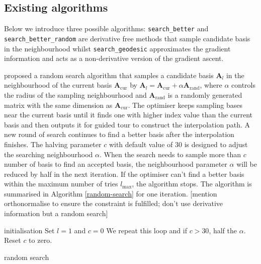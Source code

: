 \documentclass[12pt]{article}
\begin{document}
\newpage

\hypertarget{existing-algorithms}{%
\subsection{Existing algorithms}\label{existing-algorithms}}

Below we introduce three possible algorithms: \texttt{search\_better}
and \texttt{search\_better\_random} are derivative free methods that
sample candidate basis in the neighbourhood whilst
\texttt{search\_geodesic} approximates the gradient information and acts
as a non-derivative version of the gradient ascent.

\citet{posse1995projection} proposed a random search algorithm that
samples a candidate basis \(\mathbf{A}_{l}\) in the neighbourhood of the
current basis \(\mathbf{A}_{\text{cur}}\) by
\(\mathbf{A}_{l} = \mathbf{A}_{\text{cur}} + \alpha \mathbf{A}_{\text{rand}}\),
where \(\alpha\) controls the radius of the sampling neighbourhood and
\(\mathbf{A}_{\text{rand}}\) is a randomly generated matrix with the
same dimension as \(\mathbf{A}_{\text{cur}}\). The optimiser keeps
sampling bases near the current basis until it finds one with higher
index value than the current basis and then outputs it for guided tour
to construct the interpolation path. A new round of search continues to
find a better basis after the interpolation finishes. The halving
parameter \(c\) with default value of 30 is designed to adjust the
searching neighbourhood \(\alpha\). When the search needs to sample more
than \(c\) number of basis to find an accepted basis, the neighbourhood
parameter \(\alpha\) will be reduced by half in the next iteration. If
the optimiser can't find a better basis within the maximum number of
tries \(l_{\max}\), the algorithm stops. The algorithm is summarised in
Algorithm \ref{random-search} for one iteration. {[}mention
orthonormalise to ensure the constraint is fulfilled; don't use
derivative information but a random search{]}

\begin{algorithm}
\SetAlgoLined
  initialisation\;
  Set $l = 1$ and $c = 0$\;
  We repeat this loop and if $c > 30$, half the $\alpha$. Reset $c$ to zero.
  \caption{random search}
  \label{random-search}
\end{algorithm}
\end{document}
